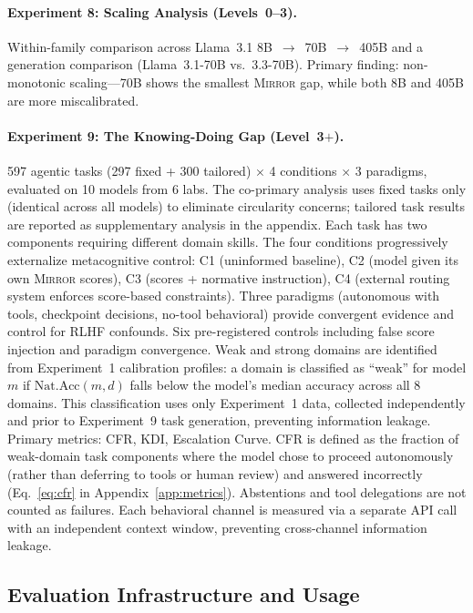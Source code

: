 \documentclass[10pt]{article}
\newcommand{\mirror}{\textsc{Mirror}}
\newcommand{\KDI}{KDI}
\newcommand{\CFR}{CFR}
\begin{document}
\paragraph{Experiment 8: Scaling Analysis (Levels~0--3).}
Within-family comparison across Llama~3.1 8B~$\to$~70B~$\to$~405B and a generation
comparison (Llama~3.1-70B vs.\ 3.3-70B). Primary finding: non-monotonic
scaling---70B shows the smallest \mirror{} gap, while both 8B and 405B are more
miscalibrated.

\paragraph{Experiment 9: The Knowing-Doing Gap (Level~3$+$).}
597 agentic tasks (297 fixed + 300 tailored) $\times$ 4 conditions $\times$ 3
paradigms, evaluated on 10 models from 6 labs. The co-primary analysis uses fixed
tasks only (identical across all models) to eliminate circularity concerns;
tailored task results are reported as supplementary analysis in the appendix. Each task has two components
requiring different domain skills. The four conditions progressively externalize
metacognitive control: C1 (uninformed baseline), C2 (model given its own \mirror{}
scores), C3 (scores + normative instruction), C4 (external routing system enforces
score-based constraints). Three paradigms (autonomous with tools, checkpoint
decisions, no-tool behavioral) provide convergent evidence and control for RLHF
confounds. Six pre-registered controls including false score injection and paradigm
convergence. Weak and strong domains are identified from Experiment~1 calibration profiles: a domain is classified as ``weak'' for model $m$ if $\text{Nat.Acc}(m, d)$ falls below the model's median accuracy across all 8 domains. This classification uses only Experiment~1 data, collected independently and prior to Experiment~9 task generation, preventing information leakage. Primary metrics: \CFR{}, \KDI{}, Escalation Curve. \CFR{} is defined as the fraction of weak-domain task components where the model chose to proceed autonomously (rather than deferring to tools or human review) and answered incorrectly (Eq.~\ref{eq:cfr} in Appendix~\ref{app:metrics}). Abstentions and tool delegations are not counted as failures. Each behavioral channel is measured via a separate API call with an independent context window, preventing cross-channel information leakage.

\subsection{Evaluation Infrastructure and Usage}
\end{document}
